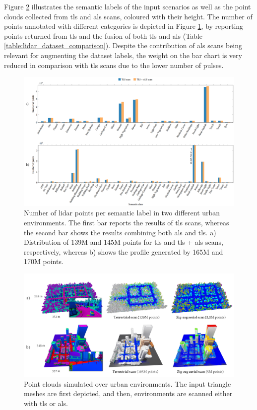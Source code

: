 Figure \ref{fig:lidar_urban_scan} illustrates the semantic labels of the input scenarios as well as the point clouds collected from \acrshort{tls} and \acrshort{als} scans, coloured with their height. The number of points annotated with different categories is depicted in Figure \ref{fig:semantic_histogram}, by reporting points returned from \acrshort{tls} and the fusion of both \acrshort{tls} and \acrshort{als} (Table \ref{table:lidar_dataset_comparison}). Despite the contribution of \acrshort{als} scans being relevant for augmenting the dataset labels, the weight on the bar chart is very reduced in comparison with \acrshort{tls} scans due to the lower number of pulses.

\begin{figure}[ht]
    \centering
    \includegraphics[width=\linewidth]{figs/lidar_simulation/bar_chart_annotations.png}
	\caption{Number of \acrshort{lidar} points per semantic label in two different urban environments. The first bar reports the results of \acrshort{tls} scans, whereas the second bar shows the results combining both \acrshort{als} and \acrshort{tls}. a) Distribution of 139M and 145M points for \acrshort{tls} and \acrshort{tls} + \acrshort{als} scans, respectively, whereas b) shows the profile generated by 165M and 170M points. }
	\label{fig:semantic_histogram}
\end{figure}

\begin{figure}[ht]
    \centering
    \includegraphics[width=\linewidth]{figs/lidar_simulation/urban_scan.png}
	\caption{Point clouds simulated over urban environments. The input triangle meshes are first depicted, and then, environments are scanned either with \acrshort{tls} or \acrshort{als}.}
	\label{fig:lidar_urban_scan}
\end{figure}

